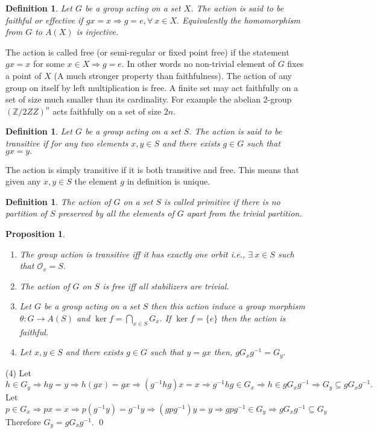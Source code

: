 \documentclass[11pt]{amsart}
\newtheorem{defn}[theorem]{Definition}
\newtheorem{prop}[theorem]{Proposition}
\newcommand{\ZZ}{\mathbb Z}
\begin{document}
\begin{defn}
Let $G$ be a group acting on a set $X$. The action is said to be faithful or effective if $gx=x \Rightarrow g=e,\forall~x\in X.$ Equivalently the homomorphism from $G$ to $A(X)$ is injective.
\end{defn}
The action is called free (or semi-regular or fixed point free) if the statement $gx=x$ for some $x\in X \Rightarrow g=e$. In other words no non-trivial element of $G$ fixes a point of $X$ (A much stronger property than faithfulness). The action of any group on itself by left multiplication is free. A finite set may act faithfully on a set of size much smaller than its cardinality. For example the abelian 2-group $({\ZZ}/2{ZZ})^n$ acts faithfully on a set of size $2n.$
\begin{defn}
Let $G$ be a group acting on a set $S$. The action is said to be transitive if for any two elements $x,y\in S$ and there exists $g\in G$ such that $gx=y.$
\end{defn}
The action is simply transitive if it is both transitive and free. This means that given any $x,y\in S$ the element $g$ in definition is unique.
\begin{defn}
The action of $G$ on a set $S$ is called primitive if there is no partition of $S$ preserved by all the elements of $G$ apart from the trivial partition.
\end{defn}
\begin{prop}
\begin{enumerate}
\item The group action is transitive iff it has exactly one orbit i.e., $\exists~x\in S$ such that $\mathcal{O}_x=S.$
\item The action of $G$ on $S$ is free iff all stabilizers are trivial.
\item Let $G$ be a group acting on a set $S$ then this action induce a group morphism $\theta:G\to A(S)$ and $\ker f=\displaystyle\bigcap_{x\in S} G_x.$ If $\ker f=\{e\}$ then the action is faithful.
\item Let $x,y\in S$ and there exists $g\in G$ such that $y=gx$ then, $gG_xg^{-1}=G_y.$
\end{enumerate}
\end{prop}
\proof (4) Let $h\in G_y \Rightarrow hy=y \Rightarrow h(gx)=gx \Rightarrow (g^{-1}hg)x=x \Rightarrow g^{-1}hg\in G_x \Rightarrow h\in gG_xg^{-1} \Rightarrow G_y\subseteq gG_xg^{-1}.$ Let $p\in G_x \Rightarrow px=x \Rightarrow p(g^{-1}y)=g^{-1}y \Rightarrow (gpg^{-1})y=y \Rightarrow gpg^{-1}\in G_y \Rightarrow gG_xg^{-1}\subseteq G_y$ Therefore $G_y=gG_xg^{-1}.$ \qed
\end{document}
